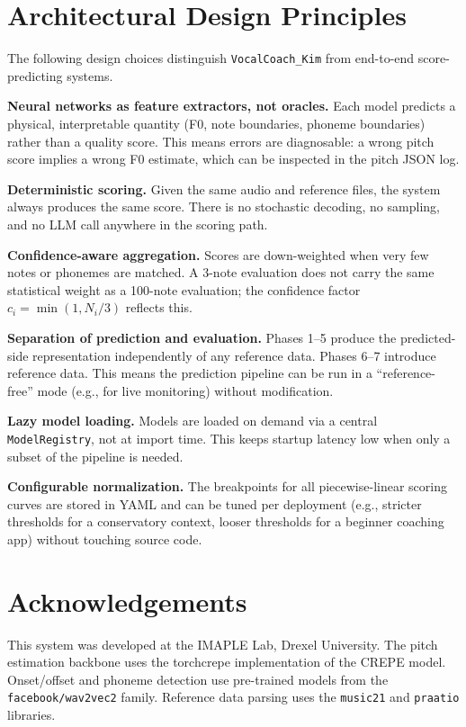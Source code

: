 \documentclass[11pt,letterpaper]{article}
\begin{document}
\section{Architectural Design Principles}

The following design choices distinguish \texttt{VocalCoach\_Kim} from
end-to-end score-predicting systems.

\textbf{Neural networks as feature extractors, not oracles.}
Each model predicts a physical, interpretable quantity (F0, note boundaries,
phoneme boundaries) rather than a quality score.
This means errors are diagnosable: a wrong pitch score implies a wrong F0
estimate, which can be inspected in the pitch JSON log.

\textbf{Deterministic scoring.}
Given the same audio and reference files, the system always produces the
same score.
There is no stochastic decoding, no sampling, and no LLM call anywhere in
the scoring path.

\textbf{Confidence-aware aggregation.}
Scores are down-weighted when very few notes or phonemes are matched.
A 3-note evaluation does not carry the same statistical weight as a
100-note evaluation; the confidence factor $c_i = \min(1, N_i/3)$ reflects
this.

\textbf{Separation of prediction and evaluation.}
Phases 1--5 produce the predicted-side representation independently of any
reference data.
Phases 6--7 introduce reference data.
This means the prediction pipeline can be run in a ``reference-free'' mode
(e.g., for live monitoring) without modification.

\textbf{Lazy model loading.}
Models are loaded on demand via a central \texttt{ModelRegistry}, not at
import time.
This keeps startup latency low when only a subset of the pipeline is needed.

\textbf{Configurable normalization.}
The breakpoints for all piecewise-linear scoring curves are stored in YAML
and can be tuned per deployment (e.g., stricter thresholds for a conservatory
context, looser thresholds for a beginner coaching app) without touching
source code.

\section*{Acknowledgements}

This system was developed at the IMAPLE Lab, Drexel University.
The pitch estimation backbone uses the torchcrepe implementation of the CREPE
model.
Onset/offset and phoneme detection use pre-trained models from the
\texttt{facebook/wav2vec2} family.
Reference data parsing uses the \texttt{music21} and \texttt{praatio}
libraries.
\end{document}

